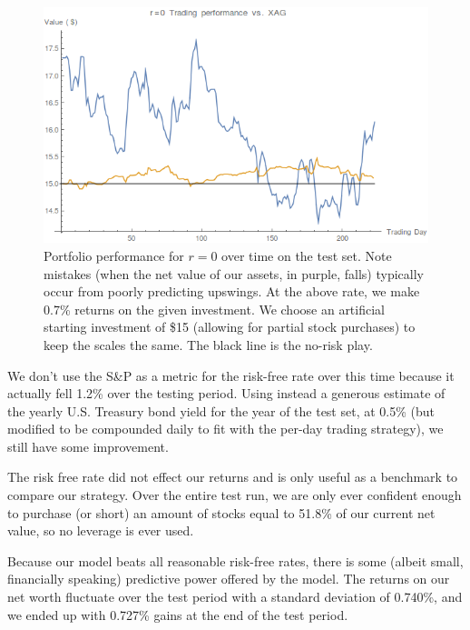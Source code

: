 \documentclass{article}
\begin{document}
\begin{figure}[ht]
\vskip 0.2in
\begin{center}
\centerline{\includegraphics[scale=0.3]{images/sparse-silver.png}}
\caption{Portfolio performance for $r=0$ over time on the test set. Note mistakes (when the net value of our assets, in purple, falls) typically occur from poorly predicting upswings. At the above rate, we make 0.7\% returns on the given investment. We choose an artificial starting investment of \$15 (allowing for partial stock purchases) to keep the scales the same. The black line is the no-risk play.}
\end{center}
\vskip -0.2in
\label{fig:preprocess}
\end{figure}

We don't use the S\&P as a metric for the risk-free rate over this time because it actually fell 1.2\% over the testing period. Using instead a generous estimate of the yearly U.S. Treasury bond yield for the year of the test set, at 0.5\% (but modified to be compounded daily to fit with the per-day trading strategy), we still have some improvement.

The risk free rate did not effect our returns and is only useful as a benchmark to compare our strategy. Over the entire test run, we are only ever confident enough to purchase (or short) an amount of stocks equal to 51.8\% of our current net value, so no leverage is ever used.

Because our model beats all reasonable risk-free rates, there is some (albeit small, financially speaking) predictive power offered by the model. The returns on our net worth fluctuate over the test period with a standard deviation of 0.740\%, and we ended up with 0.727\% gains at the end of the test period.
\end{document}
